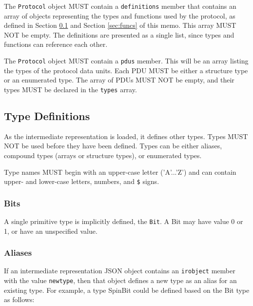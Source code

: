 \documentclass[twocolumn,a4paper]{article}
\begin{document}
The \texttt{Protocol} object MUST contain a \texttt{definitions} member
that contains an array of objects representing the types and functions
used by the protocol, as defined in Section \ref{sec:types} and Section
\ref{sec:funcs} of this memo. This array MUST NOT be empty. The definitions
are presented as a single list, since types and functions can reference
each other.

The \texttt{Protocol} object MUST contain a \texttt{pdus} member. This
will be an array listing the types of the protocol data units. Each PDU
MUST be either a structure type or an enumerated type. The array of PDUs
MUST NOT be empty, and their types MUST be declared in the \texttt{types}
array.

\subsection{Type Definitions}
\label{sec:types}

As the intermediate representation is loaded, it defines other types. Types
MUST NOT be used before they have been defined.
Types can be either aliases, compound types (arrays or structure types), or
enumerated types.

Type names MUST begin with an upper-case letter ('A'...'Z') and can contain
upper- and lower-case letters, numbers, and \verb|$| signs.

\subsubsection{Bits}

A single primitive type is implicitly defined, the \texttt{Bit}.
A Bit may have value 0 or 1, or have an unspecified value. 

\subsubsection{Aliases}

If an intermediate representation JSON object contains an \texttt{irobject}
member with the value \texttt{newtype}, then that object defines a new type
as an alias for an existing type. For example, a type SpinBit could be
defined based on the Bit type as follows:
\end{document}

